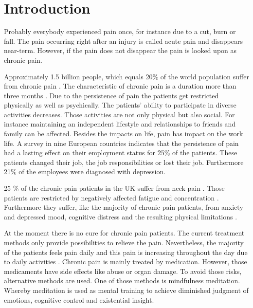 \chapter{Introduction}
Probably everybody experienced pain once, for instance due to a cut, burn or fall. The pain occurring right after an injury is called acute pain and disappears near-term. However, if the pain does not disappear the pain is looked upon as chronic pain. \cite{Briggs2010,Mello2016}

Approximately 1.5 billion people, which equals 20\% of the world population suffer from chronic pain \cite{Zeidan2016,Macfarlanea2016}. The characteristic of chronic pain is a duration more than three months \cite{Mello2016}. Due to the persistence of pain the patients get restricted physically as well as psychically. 
The patients' ability to participate in diverse activities decreases. Those activities are not only physical but also social. For instance maintaining an independent lifestyle and relationships to friends and family can be affected. Besides the impacts on life, pain has impact on the work life. A survey in nine European countries  indicates that the persistence of pain had a lasting effect on their employment status for 25\% of the patients. These patients changed their job, the job responsibilities or lost their job. Furthermore  21\% of the employees were diagnosed with depression. \cite{Breivik2006} 

25 \% of the chronic pain patients in the UK suffer from neck pain \cite{Macfarlanea2016}. Those patients are restricted by negatively affected fatigue and concentration \cite{vanRanderaat2016}. Furthermore they suffer, like the majority of chronic pain patients, from anxiety and depressed mood, cognitive distress and the resulting physical limitations \cite{gross2013}.

At the moment there is no cure for chronic pain patients. The current treatment methods only provide possibilities to relieve the pain. \cite{marcus2009,pope2017} Nevertheless, the majority of the patients feels pain daily and this pain is increasing throughout the day due to daily activities \cite{Breivik2006}.
Chronic pain is mainly treated by medication. However, those medicaments have side effects like abuse or organ damage. To avoid those risks, alternative methods are used. One of those methods is mindfulness meditation. Whereby meditation is used as mental training to achieve diminished judgment of emotions, cognitive control and existential insight. \cite{Zeidan2012}

